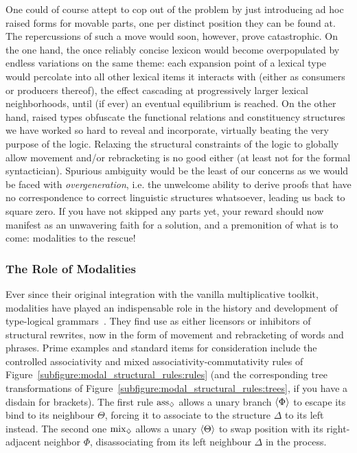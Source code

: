 One could of course attept to cop out of the problem by just introducing ad hoc raised forms for movable parts, one per distinct position they can be found at. 
The repercussions of such a move would soon, however, prove catastrophic.
On the one hand, the once reliably concise lexicon would become overpopulated by endless variations on the same theme: each expansion point of a lexical type would percolate into all other lexical items it interacts with (either as consumers or producers thereof), the effect cascading at progressively larger lexical neighborhoods, until (if ever) an eventual equilibrium is reached.
On the other hand, raised types obfuscate the functional relations and constituency structures we have worked so hard to reveal and incorporate, virtually beating the very purpose of the logic.
Relaxing the structural constraints of the logic to globally allow movement and/or rebracketing is no good either (at least not for the formal syntactician).
Spurious ambiguity would be the least of our concerns as we would be faced with \textit{overgeneration}, i.e. the unwelcome ability to derive proofs that have no correspondence to correct linguistic structures whatsoever, leading us back to square zero.
If you have not skipped any parts yet, your reward should now manifest as an unwavering faith for a solution, and a premonition of what is to come: modalities to the rescue!

\subsubsection{The Role of Modalities}
Ever since their original integration with the vanilla multiplicative toolkit, modalities have played an indispensable role in the history and development of type-logical grammars~\cite{hendriks1995ellipsis, moortgat1996multimodal,kurtonina1997structural,moortgat1997categorial,vermaat1999controlling}.
They find use as either licensors or inhibitors of structural rewrites, now in the form of movement and rebracketing of words and phrases.
Prime examples and standard items for consideration include the controlled associativity and mixed associativity-commutativity rules of Figure~\ref{subfigure:modal_structural_rules:rules} (and the corresponding tree transformations of Figure~\ref{subfigure:modal_structural_rules:trees}, if you have a disdain for brackets).
The first rule $\rulestyle{ass}_{\diamond}$ allows a unary branch $\langle{\Phi}\rangle$ to escape its bind to its neighbour $\Theta$, forcing it to associate to the structure $\Delta$ to its left instead.
The second one $\rulestyle{mix}_{\diamond}$ allows a unary $\langle{\Theta}\rangle$ to swap position with its right-adjacent neighbor $\Phi$, disassociating from its left neighbour $\Delta$ in the process.

